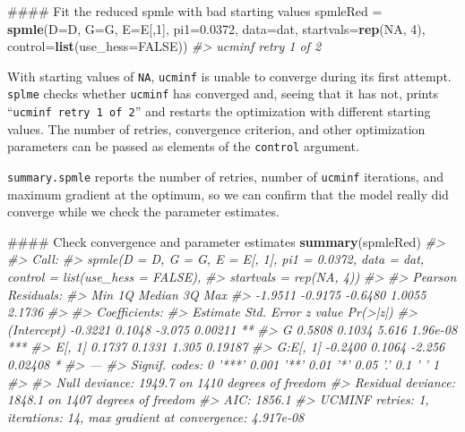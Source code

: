 \documentclass[11pt,]{article}
\newenvironment{Shaded}{\begin{snugshade}}{\end{snugshade}}
\newcommand{\KeywordTok}[1]{\textcolor[rgb]{0.13,0.29,0.53}{\textbf{#1}}}
\newcommand{\DataTypeTok}[1]{\textcolor[rgb]{0.13,0.29,0.53}{#1}}
\newcommand{\DecValTok}[1]{\textcolor[rgb]{0.00,0.00,0.81}{#1}}
\newcommand{\FloatTok}[1]{\textcolor[rgb]{0.00,0.00,0.81}{#1}}
\newcommand{\StringTok}[1]{\textcolor[rgb]{0.31,0.60,0.02}{#1}}
\newcommand{\CommentTok}[1]{\textcolor[rgb]{0.56,0.35,0.01}{\textit{#1}}}
\newcommand{\OtherTok}[1]{\textcolor[rgb]{0.56,0.35,0.01}{#1}}
\newcommand{\NormalTok}[1]{#1}
\begin{document}
\begin{Shaded}
\begin{Highlighting}[]
\NormalTok{#### Fit the reduced spmle with bad starting values}
\NormalTok{spmleRed =}\StringTok{ }\KeywordTok{spmle}\NormalTok{(}\DataTypeTok{D=}\NormalTok{D, }\DataTypeTok{G=}\NormalTok{G, }\DataTypeTok{E=}\NormalTok{E[,}\DecValTok{1}\NormalTok{], }\DataTypeTok{pi1=}\FloatTok{0.0372}\NormalTok{, }\DataTypeTok{data=}\NormalTok{dat, }
                 \DataTypeTok{startvals=}\KeywordTok{rep}\NormalTok{(}\OtherTok{NA}\NormalTok{, }\DecValTok{4}\NormalTok{), }\DataTypeTok{control=}\KeywordTok{list}\NormalTok{(}\DataTypeTok{use_hess=}\OtherTok{FALSE}\NormalTok{))}
\CommentTok{#> ucminf retry 1 of 2}
\end{Highlighting}
\end{Shaded}

With starting values of \texttt{NA}, \texttt{ucminf} is unable to
converge during its first attempt. \texttt{splme} checks whether
\texttt{ucminf} has converged and, seeing that it has not, prints
``\texttt{ucminf retry 1 of 2}'' and restarts the optimization with
different starting values. The number of retries, convergence criterion,
and other optimization parameters can be passed as elements of the
\texttt{control} argument.

\texttt{summary.spmle} reports the number of retries, number of
\texttt{ucminf} iterations, and maximum gradient at the optimum, so we
can confirm that the model really did converge while we check the
parameter estimates.

\begin{Shaded}
\begin{Highlighting}[]
\NormalTok{#### Check convergence and parameter estimates}
\KeywordTok{summary}\NormalTok{(spmleRed)}
\CommentTok{#> }
\CommentTok{#> Call:}
\CommentTok{#> spmle(D = D, G = G, E = E[, 1], pi1 = 0.0372, data = dat, control = list(use_hess = FALSE), }
\CommentTok{#>     startvals = rep(NA, 4))}
\CommentTok{#> }
\CommentTok{#> Pearson Residuals: }
\CommentTok{#>     Min       1Q   Median       3Q      Max  }
\CommentTok{#> -1.9511  -0.9175  -0.6480   1.0055   2.1736  }
\CommentTok{#> }
\CommentTok{#> Coefficients:}
\CommentTok{#>             Estimate Std. Error z value Pr(>|z|)    }
\CommentTok{#> (Intercept)  -0.3221     0.1048  -3.075  0.00211 ** }
\CommentTok{#> G             0.5808     0.1034   5.616 1.96e-08 ***}
\CommentTok{#> E[, 1]        0.1737     0.1331   1.305  0.19187    }
\CommentTok{#> G:E[, 1]     -0.2400     0.1064  -2.256  0.02408 *  }
\CommentTok{#> ---}
\CommentTok{#> Signif. codes:  0 '***' 0.001 '**' 0.01 '*' 0.05 '.' 0.1 ' ' 1}
\CommentTok{#> }
\CommentTok{#>     Null deviance: 1949.7  on 1410  degrees of freedom}
\CommentTok{#> Residual deviance: 1848.1  on 1407  degrees of freedom}
\CommentTok{#> AIC: 1856.1 }
\CommentTok{#> UCMINF retries: 1, iterations: 14, max gradient at convergence: 4.917e-08}
\end{Highlighting}
\end{Shaded}
\end{document}
